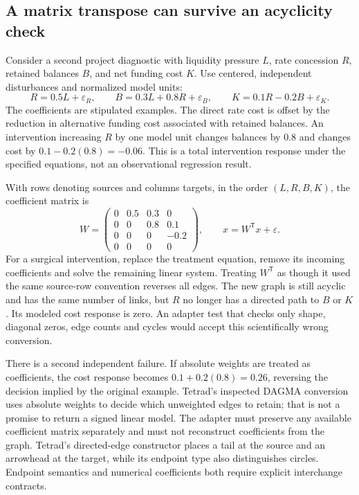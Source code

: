 \hypertarget{a-matrix-transpose-can-survive-an-acyclicity-check}{%
\subsection{A matrix transpose can survive an acyclicity
check}\label{a-matrix-transpose-can-survive-an-acyclicity-check}}

Consider a second project diagnostic with liquidity pressure \(L\), rate
concession \(R\), retained balances \(B\), and net funding cost \(K\).
Use centered, independent disturbances and normalized model units: \[
 R=0.5L+\varepsilon_R,\qquad
 B=0.3L+0.8R+\varepsilon_B,\qquad
 K=0.1R-0.2B+\varepsilon_K.
\] The coefficients are stipulated examples. The direct rate cost is
offset by the reduction in alternative funding cost associated with
retained balances. An intervention increasing \(R\) by one model unit
changes balances by \(0.8\) and changes cost by \(0.1-0.2(0.8)=-0.06\).
This is a total intervention response under the specified equations, not
an observational regression result. \citep{exec13_java_examples}

With rows denoting sources and columns targets, in the order
\((L,R,B,K)\), the coefficient matrix is \[
 W=\begin{pmatrix}
 0&0.5&0.3&0\\
 0&0&0.8&0.1\\
 0&0&0&-0.2\\
 0&0&0&0
 \end{pmatrix},\qquad x=W^{\mathsf T}x+\varepsilon.
\] For a surgical intervention, replace the treatment equation, remove
its incoming coefficients and solve the remaining linear system.
Treating \(W^{\mathsf T}\) as though it used the same source-row
convention reverses all edges. The new graph is still acyclic and has
the same number of links, but \(R\) no longer has a directed path to
\(B\) or \(K\). Its modeled cost response is zero. An adapter test that
checks only shape, diagonal zeros, edge counts and cycles would accept
this scientifically wrong conversion. \citep{exec13_java_examples}

There is a second independent failure. If absolute weights are treated
as coefficients, the cost response becomes \(0.1+0.2(0.8)=0.26\),
reversing the decision implied by the original example. Tetrad's
inspected DAGMA conversion uses absolute weights to decide which
unweighted edges to retain; that is not a promise to return a signed
linear model. The adapter must preserve any available coefficient matrix
separately and must not reconstruct coefficients from the graph.
Tetrad's directed-edge constructor places a tail at the source and an
arrowhead at the target, while its endpoint type also distinguishes
circles. Endpoint semantics and numerical coefficients both require
explicit interchange contracts.
\citep{exec13_java_examples,exec13_java_tetrad}


